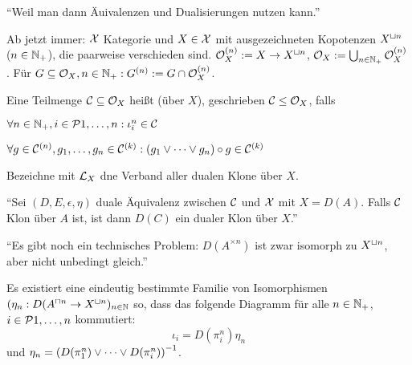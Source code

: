 \documentclass{book}
\begin{document}
\begin{answer}
    ``Weil man dann Äuivalenzen und Dualisierungen nutzen kann.''
\end{answer}

Ab jetzt immer: $\mathcal{X}$ Kategorie und $X\in\mathcal{X}$ mit ausgezeichneten Kopotenzen $X^{\mathbin{\sqcup} n}$ ($n\in\mathbb{N}_+$), die paarweise verschieden sind. $\mathcal{O}_X^{(n)}:=X\rightarrow X^{\mathbin{\sqcup} n}$, $\mathcal{O}_X:=\bigcup_{n\in\mathbb{N}_+}{\mathcal{O}_X^{(n)}}$. Für $G\subseteq\mathcal{O}_X,n\in\mathbb{N}_+: G^{(n)}:=G\cap\mathcal{O}_X^{(n)}$.

\begin{definition}
    Eine Teilmenge $\mathcal{C}\subseteq\mathcal{O}_X$ heißt  (über $X$), geschrieben $\mathcal{C}\leq\mathcal{O}_X$, falls
    \begin{statements}%
            \item $\forall n\in\nats_+,i\in\set{1,\ldots,n}:\iota_i^n\in\cC$
        \item $\forall g\in\mathcal{C}^{(n)},g_1,\ldots,g_n\in\mathcal{C}^{(k)}:(g_1\vee\cdots\vee g_n)\circ g\in\mathcal{C}^{(k)}$
    \end{statements}
\end{definition}

\begin{definition}
    Bezeichne mit $\mathcal{L}_X$ dne Verband aller dualen Klone über $X$.
\end{definition}

\begin{question}
    ``Sei $(D,E,\epsilon,\eta)$ duale Äquivalenz zwischen $\mathcal{C}$ und $\mathcal{X}$ mit $X=D(A)$. Falls $\mathcal{C}$ Klon über $A$ ist, ist dann $D(C)$ ein dualer Klon über $X$.''
\end{question}

\begin{answer}
    ``Es gibt noch ein technisches Problem: $D(A^{\times n})$ ist zwar isomorph zu $X^{\mathbin{\sqcup} n}$, aber nicht unbedingt gleich.'' 
\end{answer}

\begin{lemma}
    Es existiert eine eindeutig bestimmte Familie von Isomorphismen $(\eta_n:D(A^{\mathbin{\sqcap} n}\rightarrow X^{\mathbin{\sqcup} n})_{n\in\mathbb{N}}$ so, dass das folgende Diagramm für alle $n\in\mathbb{N}_+$, $i\in\set{1,\ldots,n}$ kommutiert:
    $$
    \iota_i=D(\pi_i^n)\eta_n
    $$
    und $\eta_n={(D(\pi^n_1)\vee\cdots\vee D(\pi^n_i))}^{-1}$.
\end{lemma}
\end{document}
